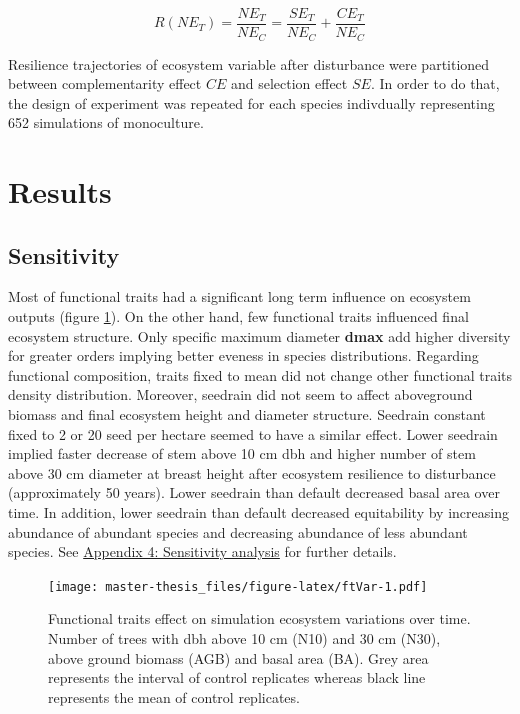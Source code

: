 \documentclass[12pt,]{article}
\let\oldsection\section
\renewcommand\section{\newpage\oldsection}
\theoremstyle{definition}
\theoremstyle{definition}
\theoremstyle{remark}
\begin{document}
\begin{equation}
  R(NE_T) = \frac{NE_T}{NE_C} = \frac{SE_T}{NE_C} + \frac{CE_T}{NE_C}
  \label{eq:RNE}
\end{equation}

Resilience trajectories of ecosystem variable after disturbance were
partitioned between complementarity effect \(CE\) and selection effect
\(SE\). In order to do that, the design of experiment was repeated for
each species indivdually representing 652 simulations of monoculture.

\section{Results}\label{results}

\subsection{Sensitivity}\label{sensitivity}

Most of functional traits had a significant long term influence on
ecosystem outputs (figure \ref{fig:ftVar}). On the other hand, few
functional traits influenced final ecosystem structure. Only specific
maximum diameter \textbf{dmax} add higher diversity for greater orders
implying better eveness in species distributions. Regarding functional
composition, traits fixed to mean did not change other functional traits
density distribution. Moreover, seedrain did not seem to affect
aboveground biomass and final ecosystem height and diameter structure.
Seedrain constant fixed to 2 or 20 seed per hectare seemed to have a
similar effect. Lower seedrain implied faster decrease of stem above 10
cm dbh and higher number of stem above 30 cm diameter at breast height
after ecosystem resilience to disturbance (approximately 50 years).
Lower seedrain than default decreased basal area over time. In addition,
lower seedrain than default decreased equitability by increasing
abundance of abundant species and decreasing abundance of less abundant
species. See
\protect\hyperlink{appendix-4-sensitivity-analysis}{Appendix 4:
Sensitivity analysis} for further details.

\begin{figure}[htbp]
\centering
\texttt{[image: master-thesis\_files/figure-latex/ftVar-1.pdf]}
\caption{\label{fig:ftVar}Functional traits effect on simulation ecosystem
variations over time. Number of trees with dbh above 10 cm (N10) and 30
cm (N30), above ground biomass (AGB) and basal area (BA). Grey area
represents the interval of control replicates whereas black line
represents the mean of control replicates.}
\end{figure}
\end{document}
